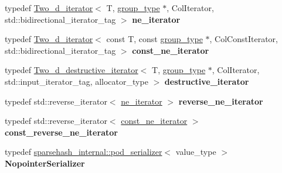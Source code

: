 \begin{DoxyCompactItemize}
\item 
typedef \hyperlink{classspp___1_1_two__d__iterator}{Two\+\_\+d\+\_\+iterator}$<$ T, \hyperlink{classspp___1_1sparsegroup}{group\+\_\+type} $\ast$, Col\+Iterator, std\+::bidirectional\+\_\+iterator\+\_\+tag $>$ {\bfseries ne\+\_\+iterator}\hypertarget{classspp___1_1sparsetable_a52f23c1cf8b5ef6bdfb3e7024d7e0b5d}{}\label{classspp___1_1sparsetable_a52f23c1cf8b5ef6bdfb3e7024d7e0b5d}

\item 
typedef \hyperlink{classspp___1_1_two__d__iterator}{Two\+\_\+d\+\_\+iterator}$<$ const T, const \hyperlink{classspp___1_1sparsegroup}{group\+\_\+type} $\ast$, Col\+Const\+Iterator, std\+::bidirectional\+\_\+iterator\+\_\+tag $>$ {\bfseries const\+\_\+ne\+\_\+iterator}\hypertarget{classspp___1_1sparsetable_a0fd35d8a198121906a49c2ef872adf7f}{}\label{classspp___1_1sparsetable_a0fd35d8a198121906a49c2ef872adf7f}

\item 
typedef \hyperlink{classspp___1_1_two__d__destructive__iterator}{Two\+\_\+d\+\_\+destructive\+\_\+iterator}$<$ T, \hyperlink{classspp___1_1sparsegroup}{group\+\_\+type} $\ast$, Col\+Iterator, std\+::input\+\_\+iterator\+\_\+tag, allocator\+\_\+type $>$ {\bfseries destructive\+\_\+iterator}\hypertarget{classspp___1_1sparsetable_aa9e992acfd9926e00f9212898fadae87}{}\label{classspp___1_1sparsetable_aa9e992acfd9926e00f9212898fadae87}

\item 
typedef std\+::reverse\+\_\+iterator$<$ \hyperlink{classspp___1_1_two__d__iterator}{ne\+\_\+iterator} $>$ {\bfseries reverse\+\_\+ne\+\_\+iterator}\hypertarget{classspp___1_1sparsetable_a7f6c11c31d1a5cc048a295b3432e0fb3}{}\label{classspp___1_1sparsetable_a7f6c11c31d1a5cc048a295b3432e0fb3}

\item 
typedef std\+::reverse\+\_\+iterator$<$ \hyperlink{classspp___1_1_two__d__iterator}{const\+\_\+ne\+\_\+iterator} $>$ {\bfseries const\+\_\+reverse\+\_\+ne\+\_\+iterator}\hypertarget{classspp___1_1sparsetable_a96ad9423457658e7f5492064c5b6460b}{}\label{classspp___1_1sparsetable_a96ad9423457658e7f5492064c5b6460b}

\item 
typedef \hyperlink{structspp___1_1sparsehash__internal_1_1pod__serializer}{sparsehash\+\_\+internal\+::pod\+\_\+serializer}$<$ value\+\_\+type $>$ {\bfseries Nopointer\+Serializer}\hypertarget{classspp___1_1sparsetable_a188d68a20e0bf759bc08dccdf7d9ccd9}{}\label{classspp___1_1sparsetable_a188d68a20e0bf759bc08dccdf7d9ccd9}

\end{DoxyCompactItemize}
